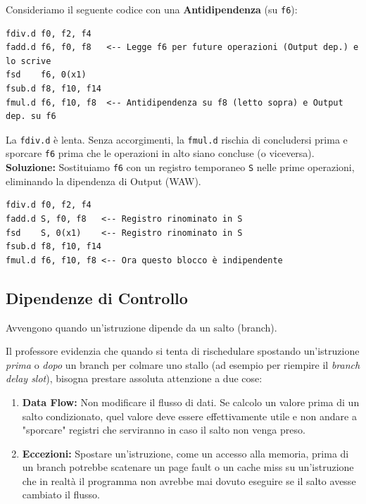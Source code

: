 \begin{example}
Consideriamo il seguente codice con una \textbf{Antidipendenza} (su \texttt{f6}):
\begin{verbatim}
fdiv.d f0, f2, f4
fadd.d f6, f0, f8   <-- Legge f6 per future operazioni (Output dep.) e lo scrive
fsd    f6, 0(x1)
fsub.d f8, f10, f14 
fmul.d f6, f10, f8  <-- Antidipendenza su f8 (letto sopra) e Output dep. su f6
\end{verbatim}

La \texttt{fdiv.d} è lenta. Senza accorgimenti, la \texttt{fmul.d} rischia di concludersi prima e sporcare \texttt{f6} prima che le operazioni in alto siano concluse (o viceversa). 
\textbf{Soluzione:} Sostituiamo \texttt{f6} con un registro temporaneo \texttt{S} nelle prime operazioni, eliminando la dipendenza di Output (WAW).
\begin{verbatim}
fdiv.d f0, f2, f4
fadd.d S, f0, f8   <-- Registro rinominato in S
fsd    S, 0(x1)    <-- Registro rinominato in S
fsub.d f8, f10, f14
fmul.d f6, f10, f8 <-- Ora questo blocco è indipendente
\end{verbatim}
\end{example}

\subsection{Dipendenze di Controllo}
Avvengono quando un'istruzione dipende da un salto (branch). 
\begin{remark}
Il professore evidenzia che quando si tenta di rischedulare spostando un'istruzione \textit{prima} o \textit{dopo} un branch per colmare uno stallo (ad esempio per riempire il \textit{branch delay slot}), bisogna prestare assoluta attenzione a due cose:
\begin{enumerate}
    \item \textbf{Data Flow:} Non modificare il flusso di dati. Se calcolo un valore prima di un salto condizionato, quel valore deve essere effettivamente utile e non andare a "sporcare" registri che serviranno in caso il salto non venga preso.
    \item \textbf{Eccezioni:} Spostare un'istruzione, come un accesso alla memoria, prima di un branch potrebbe scatenare un page fault o un cache miss su un'istruzione che in realtà il programma non avrebbe mai dovuto eseguire se il salto avesse cambiato il flusso.
\end{enumerate}
\end{remark}